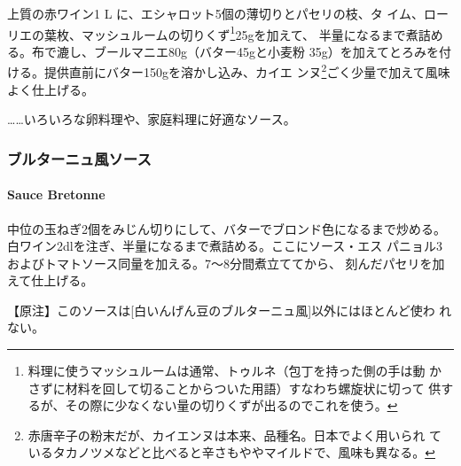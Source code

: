 \begin{recette}
 

上質の赤ワイン1\undemi{} L に、エシャロット5個の薄切りとパセリの枝、タ
イム、ローリエの葉\undemi{}枚、マッシュルームの切りくず\footnote{料理に使うマッシュルームは通常、トゥルネ（包丁を持った側の手は動
  かさずに材料を回して切ることからついた用語）すなわち螺旋状に切って
  供するが、その際に少なくない量の切りくずが出るのでこれを使う。}25gを加えて、
半量になるまで煮詰める。布で漉し、ブールマニエ80g（バター45gと小麦粉
35g）を加えてとろみを付ける。提供直前にバター150gを溶かし込み、カイエ
ンヌ\footnote{赤唐辛子の粉末だが、カイエンヌは本来、品種名。日本でよく用いられ
  ているタカノツメなどと比べると辛さもややマイルドで、風味も異なる。}ごく少量で加えて風味よく仕上げる。

\ldots{}\ldots{}いろいろな卵料理や、家庭料理に好適なソース。

\maeaki

\hypertarget{ux30d6ux30ebux30bfux30fcux30cbux30e5ux98a8ux30bdux30fcux30b9}{%
\subsubsection{ブルターニュ風ソース}\label{ux30d6ux30ebux30bfux30fcux30cbux30e5ux98a8ux30bdux30fcux30b9}}

\hypertarget{sauce-bretonne}{%
\paragraph{Sauce Bretonne}\label{sauce-bretonne}}


中位の玉ねぎ2個をみじん切りにして、バターでブロンド色になるまで炒める。
白ワイン2\undemi{}dlを注ぎ、半量になるまで煮詰める。ここにソース・エス
パニョル3\undemi{}およびトマトソース同量を加える。7〜8分間煮立ててから、
刻んだパセリを加えて仕上げる。

【原注】このソースは{[}白いんげん豆のブルターニュ風{]}以外にはほとんど使わ
れない。

\maeaki

\hypertarget{ux30bdux30fcux30b9ux30b9ux30eaux30fcux30ba6}{%
}
\end{recette}
